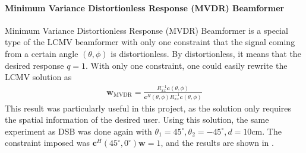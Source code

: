 \documentclass[a4paper,twoside,12pt,hidelinks]{article}
\begin{document}
\paragraph{Minimum Variance Distortionless Response (MVDR) Beamformer}
Minimum Variance Distortionless Response (MVDR) Beamformer is a special type of the LCMV beamformer with only one constraint \cite{Habets2009OnEnhancement} that the signal coming from a certain angle $(\theta,\phi)$ is distortionless. By distortionless, it means that the desired response $q=1$. With only one constraint, one could easily rewrite the LCMV solution as
\begin{align}
\textbf{w}_\text{MVDR}=\frac{R_{xx}^{-1}\textbf{c}(\theta,\phi)}{\textbf{c}^H(\theta,\phi)R_{xx}^{-1}\textbf{c}(\theta,\phi)}
\end{align}
This result was particularly useful in this project, as the solution only requires the spatial information of the desired user. Using this solution, the same experiment as DSB was done again with $\theta_1=45^\circ,\theta_2 = -45^\circ,d=10$cm. The constraint imposed was $\textbf{c}^H(45^\circ,0^\circ)\textbf{w}=1$, and the results are shown in .
\end{document}
